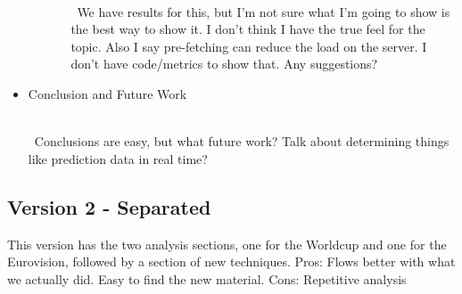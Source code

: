 \documentclass[a4paper]{article}
\newcommand{\note}[1]{
    {~\\~\color{red}\sf #1 }
}
\begin{document}
\begin{itemize}
\begin{itemize}
\begin{itemize}
                    \note{We have results for this, but I'm not sure what I'm going to show is the best way to show it. I don't think I have the true feel for the topic. Also I say pre-fetching can reduce the load on the server. I don't have code/metrics to show that. Any suggestions?}
                \end{itemize}

        \end{itemize}
\cbend

    \item Conclusion and Future Work
        \note{Conclusions are easy, but what future work? Talk about determining things like prediction data in real time?}

\end{itemize}

\subsection{Version 2 - Separated}
This version has the two analysis sections, one for the Worldcup and one for the Eurovision, followed by a section of new techniques. Pros: Flows better with what we actually did. Easy to find the new material. Cons: Repetitive analysis
\end{document}

